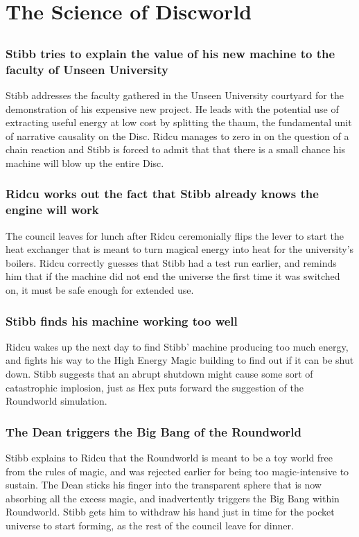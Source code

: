 \section{The Science of Discworld}


\subsection{}
\subsubsection{\Gls{Stibb} tries to explain the value of his new machine to the faculty of Unseen
    University}
\Gls{Stibb} addresses the faculty gathered in the Unseen University courtyard for the demonstration
of his expensive new project. He leads with the potential use of extracting useful energy at low
cost by splitting the thaum, the fundamental unit of narrative causality on the Disc. \Gls{Ridcu}
manages to zero in on the question of a chain reaction and \Gls{Stibb} is forced to admit that
that there is a small chance his machine will blow up the entire Disc.

\subsubsection{\Gls{Ridcu} works out the fact that \Gls{Stibb} already knows the engine will work}
The council leaves for lunch after \Gls{Ridcu} ceremonially flips the lever to start the heat
exchanger that is meant to turn magical energy into heat for the university's boilers. \Gls{Ridcu}
correctly guesses that \Gls{Stibb} had a test run earlier, and reminds him that if the machine did
not end the universe the first time it was switched on, it must be safe enough for extended use.

\subsubsection{\Gls{Stibb} finds his machine working too well}
\Gls{Ridcu} wakes up the next day to find \Gls{Stibb}' machine producing too much energy, and
fights his way to the High Energy Magic building to find out if it can be shut down. \Gls{Stibb}
suggests that an abrupt shutdown might cause some sort of catastrophic implosion, just as \Gls{Hex}
puts forward the suggestion of the Roundworld simulation.

\subsubsection{The \Gls{Dean} triggers the Big Bang of the Roundworld}
\Gls{Stibb} explains to \Gls{Ridcu} that the Roundworld is meant to be a toy world free from the
rules of magic, and was rejected earlier for being too magic-intensive to sustain. The \Gls{Dean}
sticks his finger into the transparent sphere that is now absorbing all the excess magic, and
inadvertently triggers the Big Bang within Roundworld. \Gls{Stibb} gets him to withdraw his hand
just in time for the pocket universe to start forming, as the rest of the council leave for dinner.


